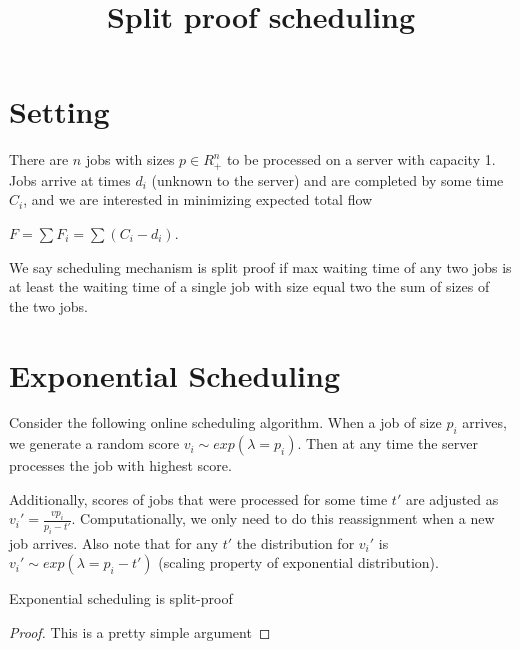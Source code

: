 \documentclass{article}
\begin{document}
\title{Split proof scheduling}
\date{\vspace{-5ex}}
\maketitle



\section{Setting}

There are $n$ jobs with sizes $p\in R_+^n$ to be processed on a server with capacity 1. Jobs arrive at times $d_i$ (unknown to the server) and are completed by some time $C_i$, and we are interested in minimizing expected total flow

$F = \sum F_i = \sum (C_i-d_i)$.

We say scheduling mechanism is split proof if max waiting time of any two jobs is at least the waiting time of a single job with size equal two the sum of sizes of the two jobs.


\section{Exponential Scheduling}

Consider the following online scheduling algorithm. When a job of size $p_i$ arrives, we generate a random score $v_i\sim exp(\lambda = p_i)$. Then at any time the server processes the job with highest score. 

Additionally, scores of jobs that were processed for some time $t'$ are adjusted as $v_i' = \frac{v p_i}{p_i-t'}$. Computationally, we only need to do this reassignment when a new job arrives. Also note that for any $t'$ the distribution for $v_i'$ is $v_i'\sim exp(\lambda = p_i-t')$ (scaling property of exponential distribution).

\begin{theorem}
Exponential scheduling is split-proof
\end{theorem}
\begin{proof}
This is a pretty simple argument
\end{proof}
\end{document}
